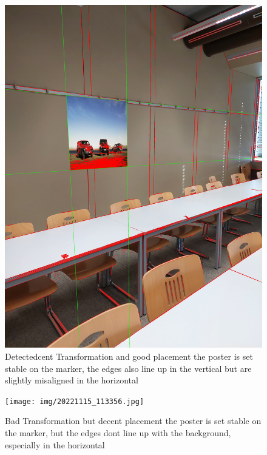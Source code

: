 \documentclass[a4paper,twocolumn]{article}
\begin{document}
    \begin{figure}[htbp]
    \centering
    \includegraphics[width=0.9\columnwidth]{img/20221115_113346.jpg} %
    \caption{Detectedcent Transformation and good placement the poster is set stable on the marker, the edges also line up in the vertical but are slightly misaligned in the horizontal }
    \label{fig:20221115_113346.jpg}
    \end{figure}
    
    \begin{figure}[htbp]
    \centering
    \texttt{[image: img/20221115\_113356.jpg]} %
    \caption{Bad Transformation but decent placement the poster is set stable on the marker, but the edges dont line up with the background, especially in the horizontal}
    \label{fig:20221115_113356.jpg}
    \end{figure}
    
\end{document}
